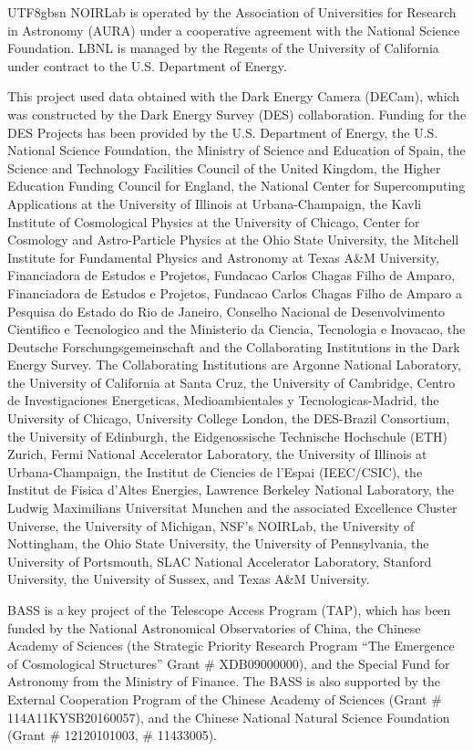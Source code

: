 \documentclass[twocolumn,linenumbers]{aastex631}
\begin{document}
\begin{CJK*}{UTF8}{gbsn}
NOIRLab is operated by the Association of Universities for Research in Astronomy (AURA) under a cooperative agreement with the National Science Foundation. LBNL is managed by the Regents of the University of California under contract to the U.S. Department of Energy.

This project used data obtained with the Dark Energy Camera (DECam), which was constructed by the Dark Energy Survey (DES) collaboration. Funding for the DES Projects has been provided by the U.S. Department of Energy, the U.S. National Science Foundation, the Ministry of Science and Education of Spain, the Science and Technology Facilities Council of the United Kingdom, the Higher Education Funding Council for England, the National Center for Supercomputing Applications at the University of Illinois at Urbana-Champaign, the Kavli Institute of Cosmological Physics at the University of Chicago, Center for Cosmology and Astro-Particle Physics at the Ohio State University, the Mitchell Institute for Fundamental Physics and Astronomy at Texas A\&M University, Financiadora de Estudos e Projetos, Fundacao Carlos Chagas Filho de Amparo, Financiadora de Estudos e Projetos, Fundacao Carlos Chagas Filho de Amparo a Pesquisa do Estado do Rio de Janeiro, Conselho Nacional de Desenvolvimento Cientifico e Tecnologico and the Ministerio da Ciencia, Tecnologia e Inovacao, the Deutsche Forschungsgemeinschaft and the Collaborating Institutions in the Dark Energy Survey. The Collaborating Institutions are Argonne National Laboratory, the University of California at Santa Cruz, the University of Cambridge, Centro de Investigaciones Energeticas, Medioambientales y Tecnologicas-Madrid, the University of Chicago, University College London, the DES-Brazil Consortium, the University of Edinburgh, the Eidgenossische Technische Hochschule (ETH) Zurich, Fermi National Accelerator Laboratory, the University of Illinois at Urbana-Champaign, the Institut de Ciencies de l’Espai (IEEC/CSIC), the Institut de Fisica d’Altes Energies, Lawrence Berkeley National Laboratory, the Ludwig Maximilians Universitat Munchen and the associated Excellence Cluster Universe, the University of Michigan, NSF’s NOIRLab, the University of Nottingham, the Ohio State University, the University of Pennsylvania, the University of Portsmouth, SLAC National Accelerator Laboratory, Stanford University, the University of Sussex, and Texas A\&M University.

BASS is a key project of the Telescope Access Program (TAP), which has been funded by the National Astronomical Observatories of China, the Chinese Academy of Sciences (the Strategic Priority Research Program “The Emergence of Cosmological Structures” Grant \# XDB09000000), and the Special Fund for Astronomy from the Ministry of Finance. The BASS is also supported by the External Cooperation Program of the Chinese Academy of Sciences (Grant \# 114A11KYSB20160057), and the Chinese National Natural Science Foundation (Grant \# 12120101003, \# 11433005).


\end{CJK*}
\end{document}
